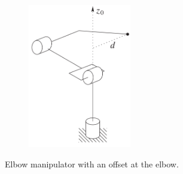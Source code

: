 \begin{frame}
\begin{columns}
\begin{column}{0.4\textwidth}
            \begin{figure}[bth]
                \centering
                \includegraphics[width=0.4\textwidth]{figures/elbow_sing_w_offset.png} 
            \end{figure}
            \vspace{-2mm}
            \centering
            \footnotesize{Elbow manipulator with an offset at the elbow.}
        \end{column}
    \end{columns}
\end{frame}


\endgroup
